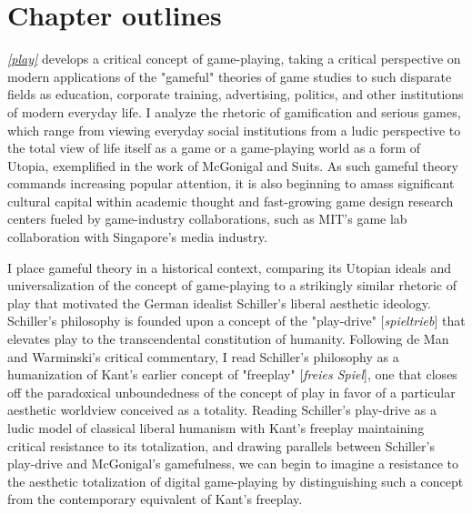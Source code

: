 \section*{Chapter outlines}
\emph{\cref{play}} develops a critical concept of game-playing, taking a critical perspective on modern applications of the "gameful" theories of game studies to such disparate fields as education, corporate training, advertising, politics, and other institutions of modern everyday life. I analyze the rhetoric of gamification and serious games, which range from viewing everyday social institutions from a ludic perspective to the total view of life itself as a game or a game-playing world as a form of Utopia, exemplified in the work of McGonigal and Suits. As such gameful theory commands increasing popular attention, it is also beginning to amass significant cultural capital within academic thought and fast-growing game design research centers fueled by game-industry collaborations, such as MIT's game lab collaboration with Singapore's media industry.

I place gameful theory in a historical context, comparing its Utopian ideals and universalization of the concept of game-playing to a strikingly similar rhetoric of play that motivated the German idealist Schiller's liberal aesthetic ideology. Schiller's philosophy is founded upon a concept of the "play-drive" [\emph{spieltrieb}] that elevates play to the transcendental constitution of humanity. Following de Man and Warminski's critical commentary, I read Schiller's philosophy as a humanization of Kant's earlier concept of "freeplay" [\emph{freies Spiel}], one that closes off the paradoxical unboundedness of the concept of play in favor of a particular aesthetic worldview conceived as a totality. Reading Schiller's play-drive as a ludic model of classical liberal humanism with Kant's freeplay maintaining critical resistance to its totalization, and drawing parallels between Schiller's play-drive and McGonigal's gamefulness, we can begin to imagine a resistance to the aesthetic totalization of digital game-playing by distinguishing such a concept from the contemporary equivalent of Kant's freeplay.


